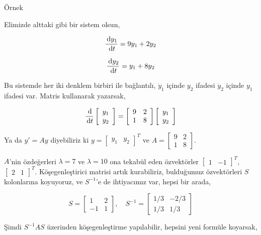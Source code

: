 \documentclass[12pt,fleqn]{article}\usepackage{../../common}
\begin{document}
Örnek

Elimizde alttaki gibi bir sistem olsun,

$$
\frac{\,\mathrm{d} y_1}{\,\mathrm{d} t} = 9 y_1 + 2 y_2
$$

$$
\frac{\,\mathrm{d} y_2}{\,\mathrm{d} t} = y_1 + 8 y_2
$$

Bu sistemde her iki denklem birbiri ile bağlantılı, $\dot{y}_1$ içinde 
$y_2$ ifadesi $\dot{y}_2$ içinde  $y_1$ ifadesi var. Matris kullanarak
yazarsak,

$$
\frac{\,\mathrm{d}}{\,\mathrm{d} t} \left[\begin{array}{c}
y_1 \\ y_2 
\end{array}\right] =
\left[\begin{array}{cc}
9 & 2 \\ 1 & 8
\end{array}\right]
\left[\begin{array}{c}
y_1 \\ y_2
\end{array}\right]
$$

Ya da $y' = Ay$ diyebiliriz ki $y = [\begin{array}{cc} y_1 & y_2 \end{array}]^T$
ve $A = \left[\begin{array}{cc} 9 & 2 \\ 1 & 8 \end{array}\right]$.

$A$'nin özdeğerleri $\lambda = 7$ ve $\lambda = 10$ ona tekabül eden
özvektörler $[\begin{array}{cc}1 & -1\end{array}]^T$, $[\begin{array}{cc}2&1\end{array}]^T$.
Köşegenleştirici matrisi artık kurabiliriz, bulduğumuz özvektörleri $S$
kolonlarına koyuyoruz, ve $S^{-1}$'e de ihtiyacımız var, hepsi bir arada,

$$
S = \left[\begin{array}{rr}
1 & 2 \\ -1 & 1
\end{array}\right], \quad
S^{-1} = \left[\begin{array}{rr}
1/3 & -2/3 \\ 1/3 & 1/3
\end{array}\right]
$$

Şimdi $S^{-1} A S$ üzerinden köşegenleştirme yapılabilir, hepsini yeni formüle
koyarsak,
\end{document}
